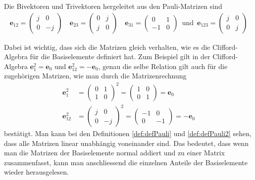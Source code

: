 \begin{definition} \label{def:defPauli2}
	Die Bivektoren und Trivektoren hergeleitet aus den Pauli-Matrizen sind
	\begin{align}
		\mathbf{e}_{12} =  
		\begin{pmatrix}
			j & 0 \\
			0 & -j
		\end{pmatrix}\quad
		\mathbf{e}_{23} =
		\begin{pmatrix}
			0 & j \\
			j & 0
		\end{pmatrix}\quad
		\mathbf{e}_{31} =
		\begin{pmatrix}
			0 & 1 \\
			-1 & 0
		\end{pmatrix}\enspace\text{und}\enspace
		\mathbf{e}_{123} =
		\begin{pmatrix}
			j & 0 \\
			0 & j
		\end{pmatrix}
	\end{align}
\end{definition}
Dabei ist wichtig, dass sich die Matrizen gleich verhalten, wie es die Clifford-Algebra für die Basiselemente definiert hat. Zum Beispiel gilt in der Clifford-Algebra $\mathbf{e}_1^2=\mathbf{e}_0$ und $\mathbf{e}_{12}^2=-\mathbf{e}_0$, genau die selbe Relation gilt auch für die zugehörigen Matrizen, wie man durch die Matrizenrechnung
\begin{align}
	\mathbf{e}_1^2 &=
	\begin{pmatrix}
		0 & 1 \\
		1 & 0
	\end{pmatrix}^2 = 
	\begin{pmatrix}
		1 & 0 \\
		0 & 1
	\end{pmatrix}= \mathbf{e}_0 \\
	\mathbf{e}_{12}^2 &=
	\begin{pmatrix}
		j & 0 \\
		0 & -j
	\end{pmatrix}^2 = 
	\begin{pmatrix}
		-1 & 0 \\
		0 & -1
	\end{pmatrix} = -\mathbf{e}_0 
\end{align}
bestätigt. Man kann bei den Definitionen \ref{def:defPauli} und \ref{def:defPauli2} sehen, dass alle Matrizen linear unabhängig voneinander sind. Das bedeutet, dass wenn man die Matrizen der Basiselemente normal addiert und zu einer Matrix zusammenfasst, kann man anschliessend die einzelnen Anteile der Basiselemente wieder herausgelesen.
